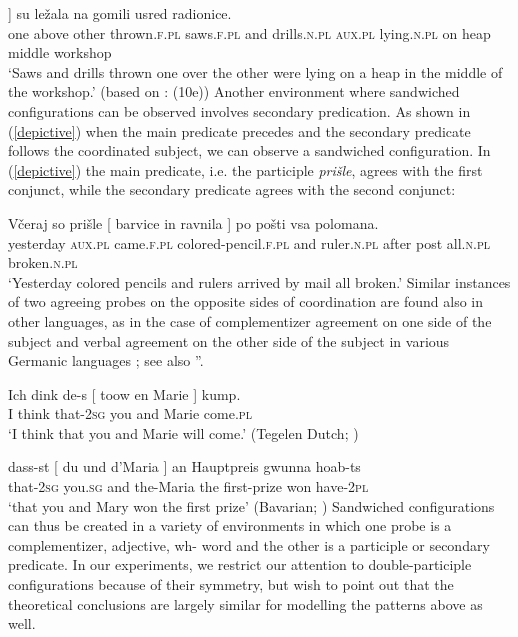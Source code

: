 \documentclass[output=paper
,modfonts
,nonflat]{langsci/langscibook}
\begin{document}
\ea \label{jednenadruge}
\gll [ Jedne na druge nabacane [ testere i svrdla ]]  su  ležala  na gomili usred radionice. \\
{} one above other  thrown.\textsc{f.pl} {} saws.\textsc{f.pl} and drills.\textsc{n.pl} {}  \textsc{aux.pl} lying.\textsc{n.pl} on heap  middle workshop\\
\glt `Saws and drills thrown one over the other were lying on a heap in the middle of the workshop.' (based on \citealt{aljovicbegovic:16}: (10e))
\z
Another environment where sandwiched configurations can be observed involves secondary predication. As shown in (\ref{depictive}) when the main predicate precedes and the secondary predicate follows the coordinated subject, we can observe a sandwiched configuration. In (\ref{depictive}) the main predicate, i.e. the participle \textit{prišle}, agrees with the first conjunct, while the secondary predicate agrees with the second conjunct:

\ea \label{depictive}
\gll Včeraj so prišle [ barvice in ravnila ] po pošti vsa polomana.\\
yesterday \textsc{aux.pl} came.\textsc{f.pl} {} colored-pencil.\textsc{f.pl} and ruler.\textsc{n.pl} {} after post all.\textsc{n.pl} broken.\textsc{n.pl}\\
\glt `Yesterday colored pencils and rulers arrived by mail all broken.'
\z
Similar instances of two agreeing probes on the opposite sides of coordination are found also in other languages, as in the case of complementizer agreement on one side of the subject and verbal agreement on the other side of the subject in various Germanic languages \citep{koppen:05, haegemankoppen:12, bayer:12}; see also ”.

\ea 
\gll Ich dink de-s [ toow en Marie ] kump. \\
I think that-\textsc{2sg} {} you and Marie {} come.\textsc{pl} \\
\glt `I think that you and Marie will come.' (Tegelen Dutch; \citealt{haegemankoppen:12})
\z

\ea 
\gll dass-st [ du         und d’Maria ] an Hauptpreis gwunna hoab-ts\\
that-\textsc{2sg} {} you.\textsc{sg} and the-Maria {} the first-prize won have-\textsc{2pl}\\
\glt `that you and Mary won the first prize' (Bavarian; \citealt{bayer:12})
\z
Sandwiched configurations can thus be created in a variety of environments in which one probe is a complementizer, adjective, wh- word and the other is a participle or secondary predicate. In our experiments, we restrict our attention to double-participle configurations because of their symmetry, but wish to point out that the theoretical conclusions are largely similar for modelling the patterns above as well.
\end{document}
